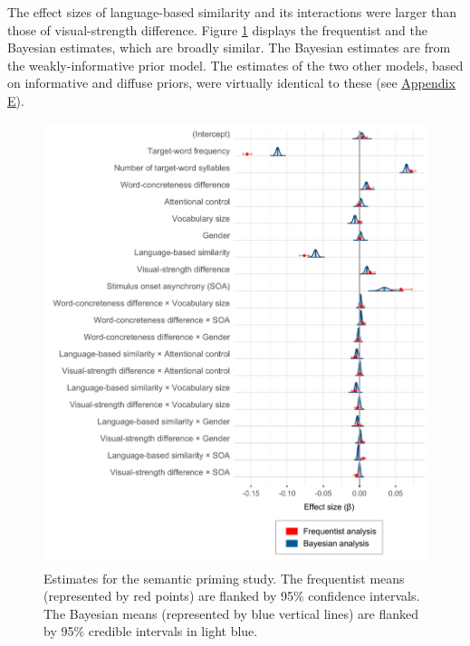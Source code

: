 \documentclass[
  12pt,
  man,floatsintext]{apa7}
\begin{document}
The effect sizes of language-based similarity and its interactions were larger than those of visual-strength difference. Figure \ref{fig:semanticpriming-frequentist-bayesian-plot-weaklyinformativepriors-exgaussian} displays the frequentist and the Bayesian estimates, which are broadly similar. The Bayesian estimates are from the weakly-informative prior model. The estimates of the two other models, based on informative and diffuse priors, were virtually identical to these (see \protect\hyperlink{appendix-E-Bayesian-analysis-results}{\underline{Appendix E}}).

\FloatBarrier

\begin{figure}

{\centering \includegraphics[width=1\linewidth]{../semanticpriming/frequentist_bayesian_plots/plots/semanticpriming_frequentist_bayesian_plot_weaklyinformativepriors_exgaussian} 

}

\caption{Estimates for the semantic priming study. The frequentist means (represented by red points) are flanked by 95\% confidence intervals. The Bayesian means (represented by blue vertical lines) are flanked by 95\% credible intervals in light blue.}\label{fig:semanticpriming-frequentist-bayesian-plot-weaklyinformativepriors-exgaussian}
\end{figure}
\end{document}
